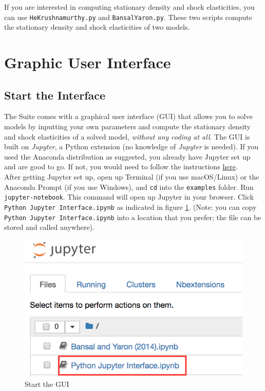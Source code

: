 \documentclass[12pt]{article}
\begin{document}
If you are interested in computing stationary density and shock elasticities, you can use \texttt{HeKrushnamurthy.py} and \texttt{BansalYaron.py}. These two scripts compute the stationary density and shock elasticities of two models.

\newpage
\section{Graphic User Interface}\label{jupyterInter}

\subsection{Start the Interface}
The Suite comes with a graphical user interface (GUI) that allows you to solve models by inputting your own parameters and compute the stationary density and shock elasticities of a solved model, \textit{without any coding at all}. The GUI is built on \textit{Jupyter}, a Python extension (no knowledge of \textit{Jupyter} is needed). If you used the Anaconda distribution as suggested, you already have Jupyter set up and are good to go. If not, you would need to follow the instructions \href{https://jupyter.org/install}{here}. \\

After getting Jupyter set up, open up Terminal (if you use macOS/Linux) or the Anaconda Prompt (if you use Windows), and \texttt{cd} into the \texttt{examples} folder. Run \texttt{jupyter-notebook}. This command will open up Jupyter in your browser. Click \texttt{Python Jupyter Interface.ipynb} as indicated in figure \ref{clickOpenJupyter}. (Note: you can copy \texttt{Python Jupyter Interface.ipynb} into a location that you prefer; the file can be stored and called anywhere).

\begin{figure}[H]
\centering
\includegraphics[scale=0.5]{jupyterScreenshot}
\caption{Start the GUI}\label{clickOpenJupyter}
\end{figure}
\end{document}
